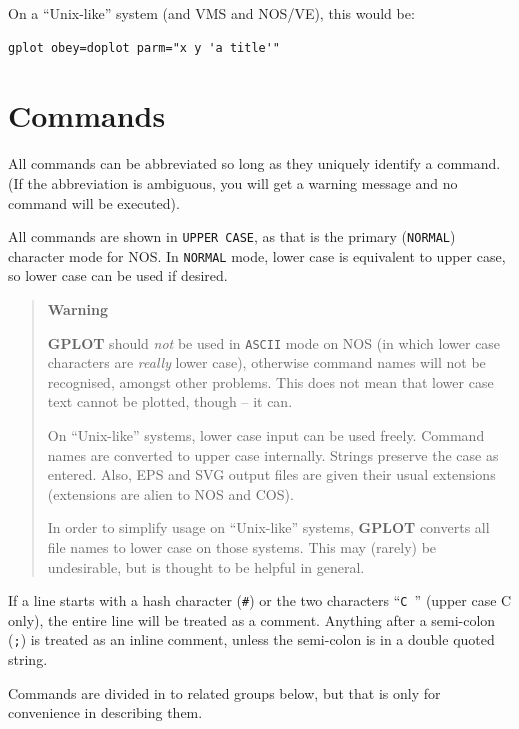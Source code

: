\documentclass[a4paper,twoside,11pt]{article}
\newcommand{\newpara}{\par\vspace{4mm}\noindent}
\begin{document}
\newpara
On a ``Unix-like'' system (and VMS and NOS/VE), this would be:
\begin{verbatim}
gplot obey=doplot parm="x y 'a title'"
\end{verbatim}

\section{Commands}
All commands can be abbreviated so long as they uniquely identify a command.
(If the abbreviation is ambiguous, you will get a warning message and no command will
be executed). 
\newpara
All commands are shown in \texttt{UPPER CASE}, as that is the primary (\texttt{NORMAL}) character mode
for NOS. In \texttt{NORMAL} mode, lower case is equivalent to upper case, so lower case can be used
if desired. 

\begin{quote}
\begin{center}
\textbf{Warning}\\
\end{center}
\textbf{GPLOT} should
\textit{not} be used in \texttt{ASCII} mode on NOS (in which lower case characters are \textit{really} lower case),
otherwise command names will not be recognised, amongst other problems.
This does not mean that lower case text cannot be plotted, though -- it can.

\newpara
On ``Unix-like'' systems, lower case input can be used freely. Command names are converted to upper case internally.
Strings preserve the case as entered. Also, EPS and SVG output files are given their usual extensions
(extensions are alien to NOS and COS).

\newpara
In order to simplify usage on ``Unix-like'' systems, \textbf{GPLOT} converts all file names to lower case on those
systems. This may (rarely) be undesirable, but is thought to be helpful in general.
\end{quote}

\newpara
If a line starts with a hash character (\texttt{\#}) or the two characters ``\texttt{C }'' (upper case C only), the entire line
will be treated as a comment. Anything after a semi-colon (\texttt{;}) is treated as an inline comment, unless the semi-colon is in
a double quoted string.

\newpara
Commands are divided in to related groups below, but that is only for 
convenience in describing them.
\end{document}
